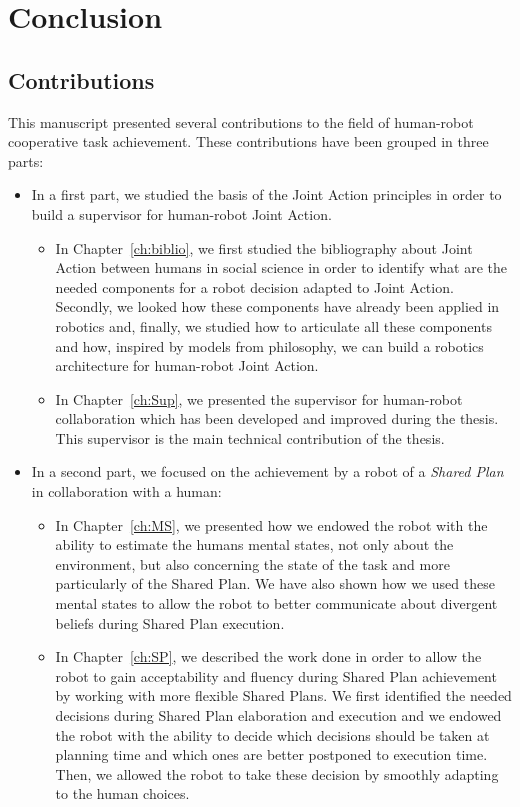 \documentclass[english, a4paper,11pt,twoside]{StyleThese}
\begin{document}
\fi


\chapter*{Conclusion}

\section*{Contributions}

This manuscript presented several contributions to the field of human-robot cooperative task achievement. These contributions have been grouped in three parts:
\begin{itemize}
\item In a first part, we studied the basis of the Joint Action principles in order to build a supervisor for human-robot Joint Action. 
\begin{itemize}
\item In Chapter~\ref{ch:biblio}, we first studied the bibliography about Joint Action between humans in social science in order to identify what are the needed components for a robot decision adapted to Joint Action. Secondly, we looked how these components have already been applied in robotics and, finally, we studied how to articulate all these components and how, inspired by models from philosophy, we can build a robotics architecture for human-robot Joint Action.
\item In Chapter~\ref{ch:Sup}, we presented the supervisor for human-robot collaboration which has been developed and improved during the thesis. This supervisor is the main technical contribution of the thesis.
\end{itemize}
\item In a second part, we focused on the achievement by a robot of a \textit{Shared Plan} in collaboration with a human:
\begin{itemize}
\item In Chapter~\ref{ch:MS}, we presented how we endowed the robot with the ability to estimate the humans mental states, not only about the environment, but also concerning the state of the task and more particularly of the Shared Plan. We have also shown how we used these mental states to allow the robot to better communicate about divergent beliefs during Shared Plan execution.
\item In Chapter~\ref{ch:SP}, we described the work done in order to allow the robot to gain acceptability and fluency during Shared Plan achievement by working with more flexible Shared Plans. We first identified the needed decisions during Shared Plan elaboration and execution and we endowed the robot with the ability to decide which decisions should be taken at planning time and which ones are better postponed to execution time. Then, we allowed the robot to take these decision by smoothly adapting to the human choices.

\end{itemize}
\end{itemize}
\end{document}
